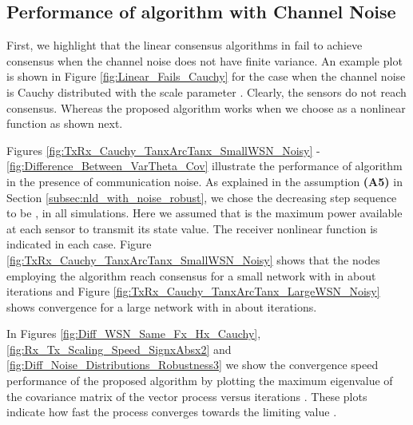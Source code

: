 \documentclass[onecolumn, draft, 12pt]{IEEEtran}
\begin{document}
\subsection{Performance of  algorithm with Channel Noise}\label{subsec:perf_nld_withs_noise_robust}
First, we highlight that the linear consensus algorithms in \cite{Boyd2007,Touri2009,MinyiHuang2007,Pescosolido2008,Barbarossa2008,MinyiHuang2008,AysalBarner2010,Nedic2011cvx, KarMoura2009,KarMoura2007} fail to achieve consensus when the channel noise does not have finite variance. An example plot is shown in Figure \ref{fig:Linear_Fails_Cauchy} for the case when the channel noise is Cauchy distributed with the scale parameter . Clearly, the sensors do not reach consensus. Whereas the proposed  algorithm works when we choose  as a nonlinear function as shown next. 

Figures \ref{fig:TxRx_Cauchy_TanxArcTanx_SmallWSN_Noisy} - \ref{fig:Difference_Between_VarTheta_Cov} illustrate the performance of  algorithm in the presence of communication noise. As explained in the assumption \textbf{(A5)} in Section \ref{subsec:nld_with_noise_robust}, we chose the decreasing step sequence to be , in all simulations. Here we assumed that  is the maximum power available at each sensor to transmit its state value. The receiver nonlinear function  is indicated in each case. Figure \ref{fig:TxRx_Cauchy_TanxArcTanx_SmallWSN_Noisy} shows that the nodes employing the  algorithm reach consensus for a small network with  in about  iterations and Figure \ref{fig:TxRx_Cauchy_TanxArcTanx_LargeWSN_Noisy} shows convergence for a large network with  in about  iterations.  

In Figures \ref{fig:Diff_WSN_Same_Fx_Hx_Cauchy}, \ref{fig:Rx_Tx_Scaling_Speed_SignxAbsx2} and \ref{fig:Diff_Noise_Distributions_Robustness3} we show the convergence speed performance of the proposed  algorithm by plotting the maximum eigenvalue of the covariance matrix of the vector process  versus iterations . These plots indicate how fast the process  converges towards the limiting value . 
\end{document}
